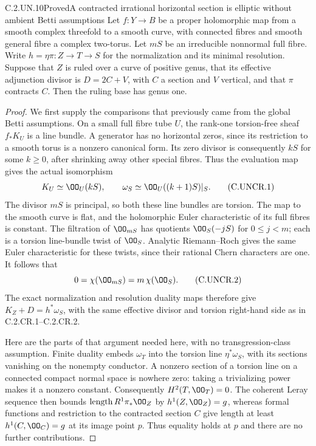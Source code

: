 \begin{statement}{C.2.UN.10}{Proved}{A contracted irrational horizontal section is elliptic without ambient Betti assumptions}
Let $f:Y\to B$ be a proper holomorphic map from a
smooth complex threefold to a smooth curve, with
connected fibres and smooth general fibre a complex
two-torus. Let $mS$ be an irreducible nonnormal full
fibre. Write $h=\eta\pi:Z\to T\to S$ for the
normalization and its minimal resolution. Suppose
that $Z$ is ruled over a curve of positive genus,
that its effective adjunction divisor is
$D=2C+V$, with $C$ a section and $V$ vertical,
and that $\pi$ contracts $C$. Then the ruling
base has genus one.
\end{statement}
\begin{proof}
We first supply the comparisons that previously
came from the global Betti assumptions. On a
small full fibre tube $U$, the rank-one torsion-free
sheaf $f_*K_U$ is a line bundle. A generator has
no horizontal zeros, since its restriction to a
smooth torus is a nonzero canonical form. Its
zero divisor is consequently $kS$ for some
$k\ge0$, after shrinking away other special
fibres. Thus the evaluation map gives the actual
isomorphism
\[
 K_U\simeq\OO_U(kS),\qquad
 \omega_S\simeq\OO_U((k+1)S)|_S.                \tag{C.UNCR.1}
\]
The divisor $mS$ is principal, so both these line
bundles are torsion. The map to the smooth curve
is flat, and the holomorphic Euler characteristic
of its full fibres is constant. The filtration
of $\OO_{mS}$ has quotients
$\OO_S(-jS)$ for $0\le j<m$; each is a torsion
line-bundle twist of $\OO_S$. Analytic
Riemann--Roch gives the same Euler characteristic
for these twists, since their rational Chern
characters are one. It follows that
\[
            0=\chi(\OO_{mS})=m\,\chi(\OO_S).
 \tag{C.UNCR.2}
\]
The exact normalization and resolution duality
maps therefore give $K_Z+D=h^*\omega_S$, with
the same effective divisor and torsion right-hand
side as in C.2.CR.1--C.2.CR.2.

Here are the parts of that argument needed here,
with no transgression-class assumption. Finite
duality embeds $\omega_T$ into the torsion line
$\eta^*\omega_S$, with its sections vanishing on
the nonempty conductor. A nonzero section of a
torsion line on a connected compact normal space
is nowhere zero: taking a trivializing power
makes it a nonzero constant. Consequently
$H^2(T,\OO_T)=0$. The coherent Leray sequence
then bounds $\operatorname{length}R^1\pi_*\OO_Z$
by $h^1(Z,\OO_Z)=g$, whereas formal functions
and restriction to the contracted section $C$
give length at least $h^1(C,\OO_C)=g$ at its
image point $p$. Thus equality holds at $p$ and
there are no further contributions.


\end{proof}
